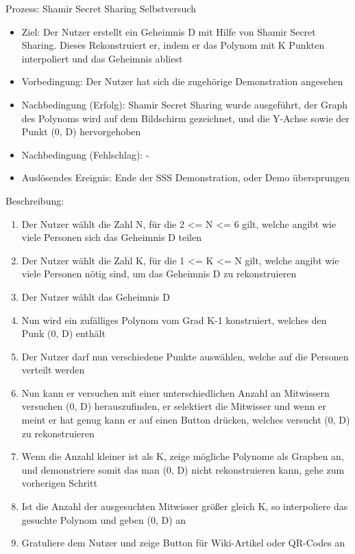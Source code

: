 \documentclass{article}
\begin{document}
\begin{FA}[start=1000]
\item Prozess: Shamir Secret Sharing Selbstversuch
\end{FA}
\begin{itemize}[label={}]
    \item Ziel: Der Nutzer erstellt ein Geheimnis D
        mit Hilfe von Shamir Secret Sharing.
        Dieses Rekonstruiert er, indem er das Polynom
        mit K Punkten interpoliert und das Geheimnis
        abliest
    \item Vorbedingung: Der Nutzer hat sich die zugehörige
        Demonstration angesehen
    \item Nachbedingung (Erfolg): Shamir Secret Sharing wurde
        ausgeführt, der Graph des Polynoms wird auf dem
        Bildschirm gezeichnet, und die Y-Achse
        sowie der Punkt (0, D) hervorgehoben
    \item Nachbedingung (Fehlschlag): -
    \item Auslösendes Ereignis: Ende der SSS Demonstration,
        oder Demo übersprungen
\end{itemize}

Beschreibung:
\begin{enumerate}
    \item Der Nutzer wählt die Zahl N,
        für die 2 <= N <= 6 gilt, welche
        angibt wie viele Personen sich das
        Geheimnis D teilen
    \item Der Nutzer wählt die Zahl K,
        für die 1 <= K <= N gilt, welche
        angibt wie viele Personen nötig
        sind, um das Geheimnis D zu
        rekonstruieren
    \item Der Nutzer wählt das Geheimnis D
    \item Nun wird ein zufälliges Polynom
        vom Grad K-1 konstruiert, welches
        den Punk (0, D) enthält
    \item Der Nutzer darf nun verschiedene
        Punkte auswählen, welche auf
        die Personen verteilt werden
    \item Nun kann er versuchen mit
        einer unterschiedlichen Anzahl
        an Mitwissern versuchen (0, D)
        herauszufinden, er selektiert
        die Mitwisser und wenn er meint
        er hat genug kann er auf
        einen Button drücken, welches
        versucht (0, D) zu rekonstruieren
    \item Wenn die Anzahl kleiner ist als
        K, zeige mögliche Polynome als
        Graphen an, und demonstriere somit
        das man (0, D) nicht rekonstruieren
        kann, gehe zum vorherigen Schritt
    \item Ist die Anzahl der ausgesuchten
        Mitwisser größer gleich K, so
        interpoliere das gesuchte Polynom
        und geben (0, D) an
    \item Gratuliere dem Nutzer und
        zeige Button für Wiki-Artikel
        oder QR-Codes an
\end{enumerate}
\end{document}
